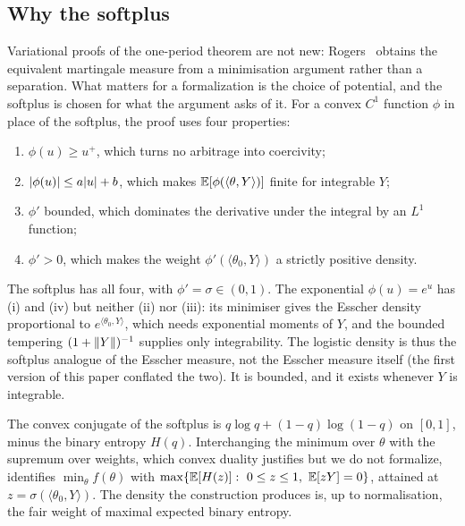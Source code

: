\documentclass[11pt]{article}
\begin{document}
\subsection{Why the softplus}\label{sec:why-softplus}
Variational proofs of the one-period theorem are not new: Rogers~\cite{Rogers1994} obtains the
equivalent martingale measure from a minimisation argument rather than a separation. What matters for a
formalization is the choice of potential, and the softplus is chosen for what the argument asks of it.
For a convex $C^1$ function $\phi$ in place of the softplus, the proof uses four properties:
\begin{enumerate}[label=(\roman*)]
\item $\phi(u)\ge u^+$, which turns no arbitrage into coercivity;
\item $\lvert \phi(u)\rvert\le a\lvert u\rvert+b$, which makes $\mathbb{E}[\phi(\langle\theta,Y\rangle)]$ finite for integrable $Y$;
\item $\phi'$ bounded, which dominates the derivative under the integral by an $L^1$ function;
\item $\phi'>0$, which makes the weight $\phi'(\langle\theta_0,Y\rangle)$ a strictly positive density.
\end{enumerate}
The softplus has all four, with $\phi'=\sigma\in(0,1)$. The exponential $\phi(u)=e^u$ has (i) and (iv)
but neither (ii) nor (iii): its minimiser gives the Esscher density proportional to
$e^{\langle\theta_0,Y\rangle}$, which needs exponential moments of $Y$, and the bounded tempering
$(1+\lVert Y\rVert)^{-1}$ supplies only integrability. The logistic density is thus the softplus analogue of
the Esscher measure, not the Esscher measure itself (the first version of this paper conflated the
two). It is bounded, and it exists whenever $Y$ is integrable.

\begin{remark}
The convex conjugate of the softplus is $q\log q+(1-q)\log(1-q)$ on $[0,1]$, minus the binary entropy
$H(q)$. Interchanging the minimum over $\theta$ with the supremum over weights, which convex duality
justifies but we do not formalize, identifies $\min_\theta f(\theta)$ with
$\max\{\E[H(z)]:\ 0\le z\le1,\ \E[zY]=0\}$, attained at $z=\sigma(\langle\theta_0,Y\rangle)$. The density
the construction produces is, up to normalisation, the fair weight of maximal expected binary entropy.
\end{remark}

\end{document}
